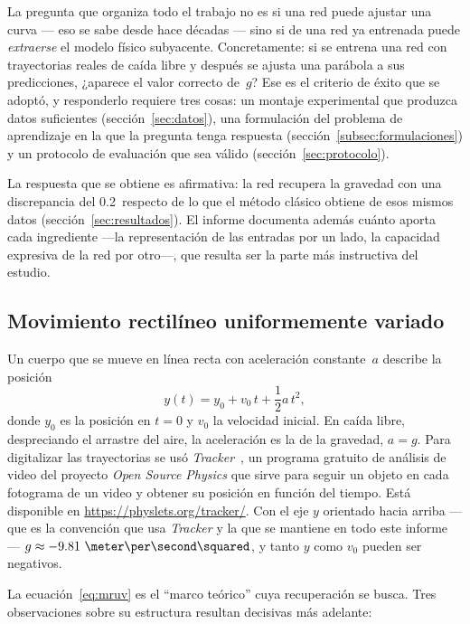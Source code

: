 \documentclass[titlepage,11pt]{article}
\providecommand{\num}[1]{\ensuremath{#1}}
\providecommand{\SI}[2]{#1\,#2}
\providecommand{\percent}{\char37\relax}
\begin{document}
La pregunta que organiza todo el trabajo no es si una red puede ajustar una
curva --- eso se sabe desde hace décadas --- sino si de una red ya entrenada
puede \emph{extraerse} el modelo físico subyacente. Concretamente: si se
entrena una red con trayectorias reales de caída libre y después se ajusta una
parábola a sus predicciones, ¿aparece el valor correcto de~$g$? Ese es el
criterio de éxito que se adoptó, y responderlo requiere tres cosas: un montaje
experimental que produzca datos suficientes (sección~\ref{sec:datos}), una
formulación del problema de aprendizaje en la que la pregunta tenga respuesta
(sección~\ref{subsec:formulaciones}) y un protocolo de evaluación que sea
válido (sección~\ref{sec:protocolo}).

La respuesta que se obtiene es afirmativa: la red recupera la gravedad con una
discrepancia del \SI{0.2}{\percent} respecto de lo que el método clásico
obtiene de esos mismos datos (sección~\ref{sec:resultados}). El informe
documenta además cuánto aporta cada ingrediente ---la representación de las
entradas por un lado, la capacidad expresiva de la red por otro---, que resulta
ser la parte más instructiva del estudio.

\subsection{Movimiento rectilíneo uniformemente variado}
\label{subsec:mru}

Un cuerpo que se mueve en línea recta con aceleración constante~$a$ describe
la posición
\begin{equation}
  y(t) = y_0 + v_0\,t + \frac{1}{2}a\,t^2,
  \label{eq:mruv}
\end{equation}
donde $y_0$ es la posición en $t=0$ y $v_0$ la velocidad inicial. En caída
libre, despreciando el arrastre del aire, la aceleración es la de la gravedad,
$a=g$. Para digitalizar las trayectorias se usó \emph{Tracker}~\cite{tracker}, un
programa gratuito de análisis de video del proyecto \emph{Open Source Physics}
que sirve para seguir un objeto en cada fotograma de un video y obtener su
posición en función del tiempo. Está disponible en
\url{https://physlets.org/tracker/}. Con el eje $y$ orientado hacia arriba --- que es la convención que usa
\emph{Tracker} y la que se mantiene en todo este informe ---
$g\approx\num{-9.81}~\meter\per\second\squared$, y tanto $y$ como $v_0$ pueden
ser negativos.

La ecuación~\eqref{eq:mruv} es el \enquote{marco teórico} cuya recuperación se
busca. Tres observaciones sobre su estructura resultan decisivas más adelante:
\end{document}
